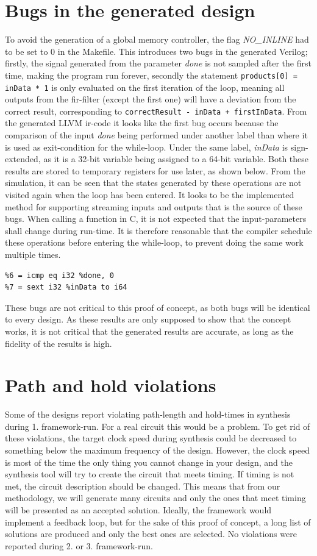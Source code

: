 \section{\label{sec:designbugs}Bugs in the generated design}
To avoid the generation of a global memory controller, the flag \textit{NO\_INLINE} had to be set to 0 in the Makefile. This introduces two bugs in the generated Verilog; firstly, the signal generated from the parameter \textit{done} is not sampled after the first time, making the program run forever, secondly the statement \verb!products[0] = inData * 1! is only evaluated on the first iteration of the loop, meaning all outputs from the \gls{fir}-filter (except the first one) will have a deviation from the correct result, corresponding to \verb!correctResult - inData + firstInData!. From the generated LLVM \gls{ir}-code it looks like the first bug occurs because the comparison of the input \textit{done} being performed under another label than where it is used as exit-condition for the while-loop. Under the same label, \textit{inData} is sign-extended, as it is a 32-bit variable being assigned to a 64-bit variable. Both these results are stored to temporary registers for use later, as shown below. From the simulation, it can be seen that the states generated by these operations are not visited again when the loop has been entered. It looks to be the implemented method for supporting streaming inputs and outputs that is the source of these bugs. When calling a function in C, it is not expected that the input-parameters shall change during run-time. It is therefore reasonable that the compiler schedule these operations before entering the while-loop, to prevent doing the same work multiple times.
\lstset{language=llvm,style=LLVMstyle}
\begin{lstlisting}
%6 = icmp eq i32 %done, 0
%7 = sext i32 %inData to i64
\end{lstlisting}
These bugs are not critical to this proof of concept, as both bugs will be identical to every design. As these results are only supposed to show that the concept works, it is not critical that the generated results are accurate, as long as the fidelity of the results is high.
\section{\label{sec:pathholdviolations}Path and hold violations}
Some of the designs report violating path-length and hold-times in synthesis during 1. framework-run. For a real circuit this would be a problem. To get rid of these violations, the target clock speed during synthesis could be decreased to something below the maximum frequency of the design. However, the clock speed is most of the time the only thing you cannot change in your design, and the synthesis tool will try to create the circuit that meets timing. If timing is not met, the circuit description should be changed. This means that from our methodology, we will generate many circuits and only the ones that meet timing will be presented as an accepted solution. Ideally, the framework would implement a feedback loop, but for the sake of this proof of concept, a long list of solutions are produced and only the best ones are selected. No violations were reported during 2. or 3. framework-run.

